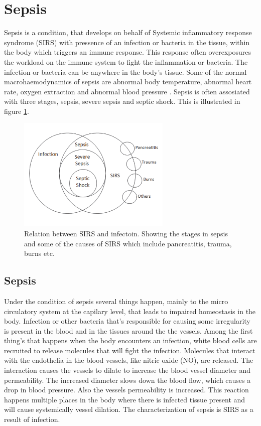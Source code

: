 \section{Sepsis}

Sepsis is a condition, that develops on behalf of Systemic inflammatory response syndrome (SIRS) with pressence of an infection or bacteria in the tissue, within the body which triggers an immune response. This response often overexposures the workload on the immune system to fight the inflammation or bacteria. The infection or bacteria can be anywhere in the body’s tissue. Some of the normal macrohaemodynamics of sepsis are abnormal body temperature, abnormal heart rate, oxygen extraction and abnormal blood pressure \cite{plunta2010,kanta2014}.
Sepsis is often assosiated with three stages, sepsis, severe sepsis and septic shock. This is illustrated in figure \ref{fig:Sepsis_stages}.

\begin{figure}[H]
	\centering	\includegraphics[width=0.65\textwidth]{figures/Sepsis_stages}
	\caption{Relation between SIRS and infectoin. Showing the stages in sepsis and some of the causes of SIRS which include pancreatitis, trauma, burns etc.}
	\label{fig:Sepsis_stages}
\end{figure} \vspace{-.3cm}

\subsection{Sepsis}

Under the condition of sepsis several things happen, mainly to the micro circulatory system at the capilary level, that leads to impaired homeostasis in the body. Infection or other bacteria that’s responsible for causing some irregularity is present in the blood and in the tissues around the the vessels. Among the first thing’s that happens when the body encounters an infection, white blood cells are recruited to release molecules that will fight the infection. Molecules that interact with the endothelia in the blood vessels, like nitric oxide (NO), are released. The interaction causes the vessels to dilate to increase the blood vessel diameter and permeability. The increased diameter slows down the blood flow, which causes a drop in blood pressure. Also the vessels permeability is increased. This reaction happens multiple places in the body where there is infected tissue present and will cause systemically vessel dilation. The characterization of sepsis is SIRS as a result of infection. \cite{baudouin200,kanta2014}

